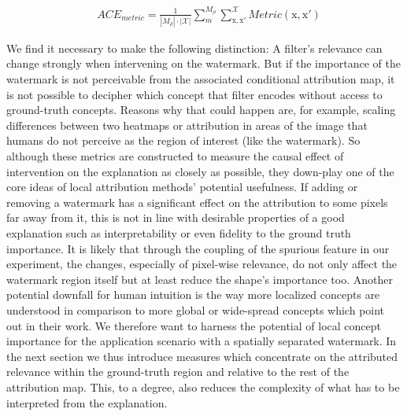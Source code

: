 \begin{align}\label{eq:ace_metric}
& ACE_{metric} = \frac{1}{|M_\rho|\cdot |\mathcal{X}| }\sum_{m}^{M_{\rho}} \sum_{\mathrm{x,x'}}^{\mathcal{X}} Metric(\mathrm{x,x'})
\end{align}

We find it necessary to make the following distinction: A filter's relevance can change strongly when intervening on the watermark. But if the importance of the watermark is not perceivable from the associated conditional attribution map, it is not possible to decipher which concept that filter encodes without access to ground-truth concepts. Reasons why that could happen are, for example, scaling differences between two heatmaps or attribution in areas of the image that humans do not perceive as the region of interest (like the watermark).
So although these metrics are constructed to measure the causal effect of intervention on the explanation as closely as possible, they down-play one of the core ideas of local attribution methods' potential usefulness. If adding or removing a watermark has a significant effect on the attribution to some pixels far away from it, this is not in line with desirable properties of a good explanation such as interpretability or even fidelity to the ground truth importance. It is likely that through the coupling of the spurious feature in our experiment, the changes, especially of pixel-wise relevance, do not only affect the watermark region itself but at least reduce the shape's importance too. 
Another potential downfall for human intuition is the way more localized concepts are understood in comparison to more global or wide-spread concepts which \citet{Achtibat2022} point out in their work. We therefore want to harness the potential of local concept importance for the application scenario with a spatially separated watermark.
In the next section we thus introduce measures which concentrate on the attributed relevance within the ground-truth region and relative to the rest of the attribution map. This, to a degree, also reduces the complexity of what has to be interpreted from the explanation.
